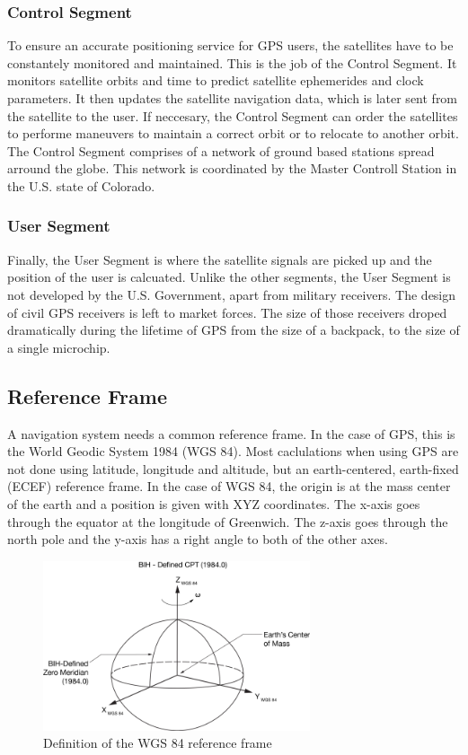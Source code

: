 \subsubsection{Control Segment}

To ensure an accurate positioning service for GPS users, the satellites have to be constantely monitored and maintained.
This is the job of the Control Segment.
It monitors satellite orbits and time to predict satellite ephemerides and clock parameters.
It then updates the satellite navigation data, which is later sent from the satellite to the user.
If neccesary, the Control Segment can order the satellites to performe maneuvers to maintain a correct orbit or to relocate to another orbit.
The Control Segment comprises of a network of ground based stations spread arround the globe.
This network is coordinated by the Master Controll Station in the U.S. state of Colorado.

\subsubsection{User Segment}

Finally, the User Segment is where the satellite signals are picked up and the position of the user is calcuated.
Unlike the other segments, the User Segment is not developed by the U.S. Government, apart from military receivers.
The design of civil GPS receivers is left to market forces.
The size of those receivers droped dramatically during the lifetime of GPS from the size of a backpack, to the size of a single microchip.

\subsection{Reference Frame}

A navigation system needs a common reference frame.
In the case of GPS, this is the World Geodic System 1984 (WGS 84).
Most caclulations when using GPS are not done using latitude, longitude and altitude, but an earth-centered, earth-fixed (ECEF) reference frame.
In the case of WGS 84, the origin is at the mass center of the earth and a position is given with XYZ coordinates.
The x-axis goes through the equator at the longitude of Greenwich.
The z-axis goes through the north pole and the y-axis has a right angle to both of the other axes.

\begin{figure}[ht]
 \centering
 \includegraphics[width=0.7\textwidth]{images/WGS84.png}
 \caption{Definition of the WGS 84 reference frame \cite{WGS84}}
 \label{fig:wgs84}
\end{figure}


